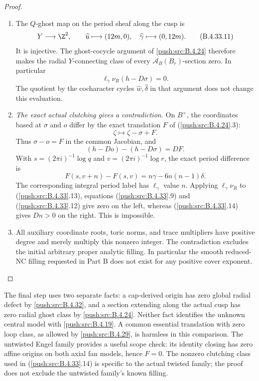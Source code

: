 \begin{proof}
\begin{enumerate}[label=\arabic*.,leftmargin=*]
\item The $Q$-ghost map on the period sheaf
along the cusp is
\[
 Y\longrightarrow\Z^2,\qquad
 \widehat u\longmapsto(12m,0),\quad
 \widehat\gamma\longmapsto(0,12m).
 \tag{B.4.33.11}
\]
It is injective. The ghost-cocycle
argument of \ref{push:src:B.4.24} therefore makes the
radial $Y$-connecting class of every
$\mathcal A_B(B_r)$-section zero.
In particular
\[
             \ell_\gamma\nu_R(h-D\sigma)=0.
 \tag{B.4.33.12}
\]
The quotient by the cocharacter cycles
$\widehat w,\widehat\delta$ in that
argument does not change this evaluation.

\item \emph{The exact actual clutching gives a contradiction.}
On $B^\times$, the coordinates based at
$\sigma$ and $o$ differ by the exact
translation $F$ of (\ref{push:src:B.4.24}.3):
\[
 \zeta\longmapsto\zeta-\sigma+F.
\]
Thus $\sigma-o=F$ in the common Jacobian,
and
\[
 (h-D o)-(h-D\sigma)=D F.
 \tag{B.4.33.13}
\]
With $s=(2\pi i)^{-1}\log q$ and
$v=(2\pi i)^{-1}\log r$, the exact
period difference is
\[
 F(s,v+n)-F(s,v)
       =n\gamma-6n(n-1)\delta.
 \tag{B.4.33.14}
\]
The corresponding integral period label
has $\ell_\gamma$ value $n$.
Applying $\ell_\gamma\nu_R$ to
(\ref{push:src:B.4.33}.13), equations (\ref{push:src:B.4.33}.9) and
(\ref{push:src:B.4.33}.12) give zero on the left,
whereas (\ref{push:src:B.4.33}.14) gives $Dn>0$ on
the right. This is impossible.

\item All auxiliary coordinate roots, toric
norms, and trace multipliers have positive
degree and merely multiply this nonzero
integer. The contradiction excludes the
initial arbitrary proper analytic filling.
In particular the smooth reduced-NC
filling requested in Part B does not
exist for any positive cover exponent.
\end{enumerate}
\end{proof}

The final step uses two separate facts: a
cap-derived origin has zero global radial
defect by \ref{push:src:B.4.32}, and a section extending
along the actual cusp has zero radial
ghost class by \ref{push:src:B.4.24}. Neither fact
identifies the unknown central model with
\ref{push:src:B.4.19}. A common essential translation
with zero loop class, as allowed by
\ref{push:src:B.4.29}, is harmless in this comparison.
The untwisted Engel family provides a
useful scope check: its identity closing
has zero affine origins on both axial
fan models, hence $F=0$. The nonzero
clutching class used in (\ref{push:src:B.4.33}.14)
is specific to the actual twisted
family; the proof does not exclude
the untwisted family's known filling.


